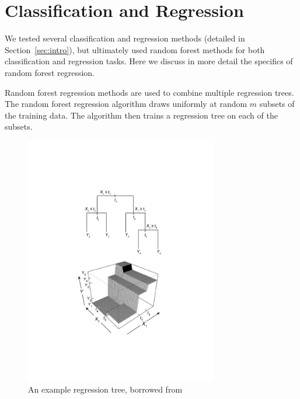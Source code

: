 \documentclass{article} %
\begin{document}

\section{Classification and Regression}
\label{sec:regression}

We tested several classification and regression methods (detailed in Section~\ref{sec:intro}), but ultimately used random forest methods for both classification and regression tasks. Here we discuss in more detail the specifics of random forest regression.

Random forest regression methods are used to combine multiple regression trees. The random forest regression algorithm draws uniformly at random $m$ subsets of the training data. The algorithm then trains a regression tree on each of the subsets.

\begin{figure}[H]
  \centering
  \includegraphics[trim={0 6cm 0 6cm}, width=0.75\textwidth]{rt.pdf}
  \caption{An example regression tree, borrowed from \cite{rffig}}
  \label{fig:regtree}
\end{figure}
\end{document}
